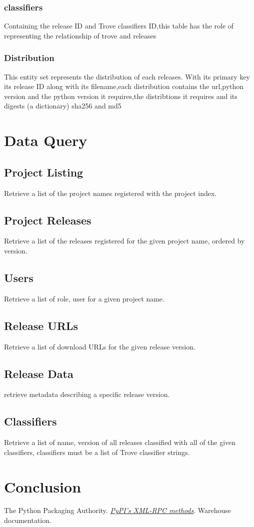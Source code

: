 \documentclass[a4paper,12pt]{article}
\begin{document}
\subsubsection{classifiers}
Containing the release ID and Trove classifiers ID,this table has the role of representing the relationship of trove and releases
\subsubsection{Distribution}
This entity set represents the distribution of each releases. With its primary key its release ID along with its filename,each distribution contains the url,python version and the python version it requires,the distribtions it requires and its digests (a dictionary) sha256 and md5


\section{Data Query}
\subsection{Project Listing}
Retrieve a list of the project names registered with the project index.
\subsection{Project Releases}
Retrieve a list of the releases registered for the given project name, ordered by version.
\subsection{Users}
Retrieve a list of role, user for a given project name.
\subsection{Release URLs}
Retrieve a list of download URLs for the given release version.
\subsection{Release Data}
retrieve metadata describing a specific release version.
\subsection{Classifiers}
Retrieve a list of name, version of all releases classified with all of the given classifiers, classifiers must be a list of Trove classifier strings.
\section{Conclusion}

\begin{thebibliography}{69}
    The Python Packaging Authority.
    \href{https://warehouse.readthedocs.io/api-reference/xml-rpc}
         {\emph{PyPI’s XML-RPC methods}}.
    Warehouse documentation.
\end{thebibliography}
\end{document}
